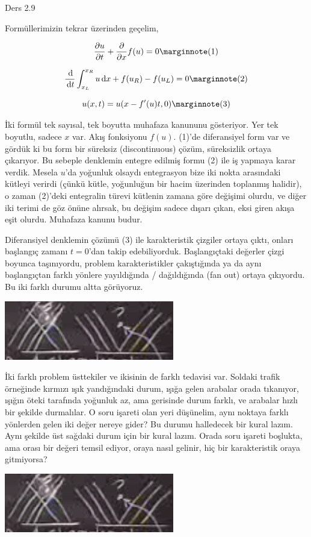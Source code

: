 \documentclass[12pt,fleqn]{article}\usepackage{../../common}
\begin{document}
Ders 2.9

Formüllerimizin tekrar üzerinden geçelim,

$$
\frac{\partial u}{\partial t} +
\frac{\partial }{\partial x} f(u) = 0
\mlabel{1}
$$

$$
\frac{\ud}{\ud t} \int_{x_L}^{x_R} u \ud x + f(u_R) - f(u_L) = 0
\mlabel{2}
$$

$$
u(x,t) = u(x - f'(u) t, 0)
\mlabel{3}
$$

İki formül tek sayısal, tek boyutta muhafaza kanununu gösteriyor. Yer tek
boyutlu, sadece $x$ var. Akış fonksiyonu $f(u)$. (1)'de diferansiyel form var ve
gördük ki bu form bir süreksiz (discontinuous) çözüm, süreksizlik ortaya
çıkarıyor. Bu sebeple denklemin entegre edilmiş formu (2) ile iş yapmaya karar
verdik. Mesela $u$'da yoğunluk olsaydı entegrasyon bize iki nokta arasındaki
kütleyi verirdi (çünkü kütle, yoğunluğun bir hacim üzerinden toplanmış halidir),
o zaman (2)'deki entegralin türevi kütlenin zamana göre değişimi olurdu, ve
diğer iki terimi de göz önüne alırsak, bu değişim sadece dışarı çıkan, eksi
giren akışa eşit olurdu. Muhafaza kanunu budur.

Diferansiyel denklemin çözümü (3) ile karakteristik çizgiler ortaya çıktı,
onları başlangıç zamanı $t=0$'dan takip edebiliyorduk. Başlangıçtaki değerler
çizgi boyunca taşınıyordu, problem karakteristikler çakıştığında ya da aynı
başlangıçtan farklı yönlere yayıldığında / dağıldığında (fan out) ortaya
çıkıyordu. Bu iki farklı durumu altta görüyoruz.

\includegraphics[width=20em]{compscieng_2_09_01.png}

İki farklı problem üsttekiler ve ikisinin de farklı tedavisi var. Soldaki trafik
örneğinde kırmızı ışık yandığındaki durum, ışığa gelen arabalar orada tıkanıyor,
ışığın öteki tarafında yoğunluk az, ama gerisinde durum farklı, ve arabalar
hızlı bir şekilde durmalılar. O soru işareti olan yeri düşünelim, aynı noktaya
farklı yönlerden gelen iki değer nereye gider? Bu durumu halledecek bir kural
lazım. Aynı şekilde üst sağdaki durum için bir kural lazım. Orada soru işareti
boşlukta, ama orası bir değeri temsil ediyor, oraya nasıl gelinir, hiç bir
karakteristik oraya gitmiyorsa?

\includegraphics[width=20em]{compscieng_2_09_01.png}
\end{document}
